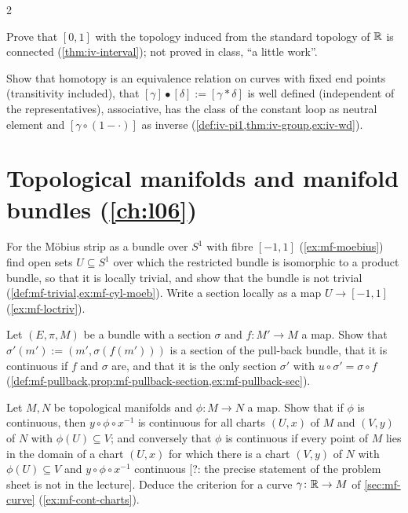 \begin{paracol}{2}
\begin{exercise}[{$[0,1]$} is connected]\label{ex:iv-interval-full}
Prove that $[0,1]$ with the topology induced from the standard topology of $\mathbb{R}$ is connected (\cref{thm:iv-interval}); not proved in class, ``a little work''.
\end{exercise}

\begin{exercise}\label{ex:iv-group-full}
Show that homotopy is an equivalence relation on curves with fixed end points (transitivity included), that $[\gamma]\bullet[\delta]:=[\gamma*\delta]$ is well defined
(independent of the representatives), associative, has the class of the constant loop as neutral element and $[\gamma\circ(1-\cdot)]$ as inverse
(\cref{def:iv-pi1,thm:iv-group,ex:iv-wd}).
\end{exercise}

\section{Topological manifolds and manifold bundles (\cref{ch:l06})}\label{exam:ch06}

\begin{exercise}\label{ex:mf-moebius-full}
For the Möbius strip as a bundle over $S^1$ with fibre $[-1,1]$ (\cref{ex:mf-moebius}) find open sets $U\subseteq S^1$ over which the restricted bundle is isomorphic to a product bundle, so that it is locally trivial, and show that the bundle
is not trivial (\cref{def:mf-trivial,ex:mf-cyl-moeb}). Write a section locally as a map $U\to[-1,1]$ (\cref{ex:mf-loctriv}).
\end{exercise}

\begin{exercise}\label{ex:mf-pullback-full}
Let $(E,\pi,M)$ be a bundle with a section $\sigma$ and $f\colon M'\to M$ a map. Show that $\sigma'(m'):=(m',\sigma(f(m')))$ is a section of the pull-back bundle, that it is continuous if $f$ and $\sigma$ are, and that it is the only
section $\sigma'$ with $u\circ\sigma'=\sigma\circ f$ (\cref{def:mf-pullback,prop:mf-pullback-section,ex:mf-pullback-sec}).
\end{exercise}

\begin{exercise}\label{ex:mf-cont-charts-full}
Let $M,N$ be topological manifolds and $\phi\colon M\to N$ a map. Show that if $\phi$ is continuous, then $y\circ\phi\circ x^{-1}$ is continuous for all charts $(U,x)$ of $M$ and $(V,y)$ of $N$ with $\phi(U)\subseteq V$; and conversely that $\phi$ is continuous if every point of $M$ lies in the domain
of a chart $(U,x)$ for which there is a chart $(V,y)$ of $N$ with $\phi(U)\subseteq V$ and $y\circ\phi\circ x^{-1}$ continuous [?: the precise statement of the problem sheet is not in the lecture]. Deduce the criterion for a curve $\gamma\colon\mathbb{R}\to M$ of \cref{sec:mf-curve}
(\cref{ex:mf-cont-charts}).
\end{exercise}


\end{paracol}

